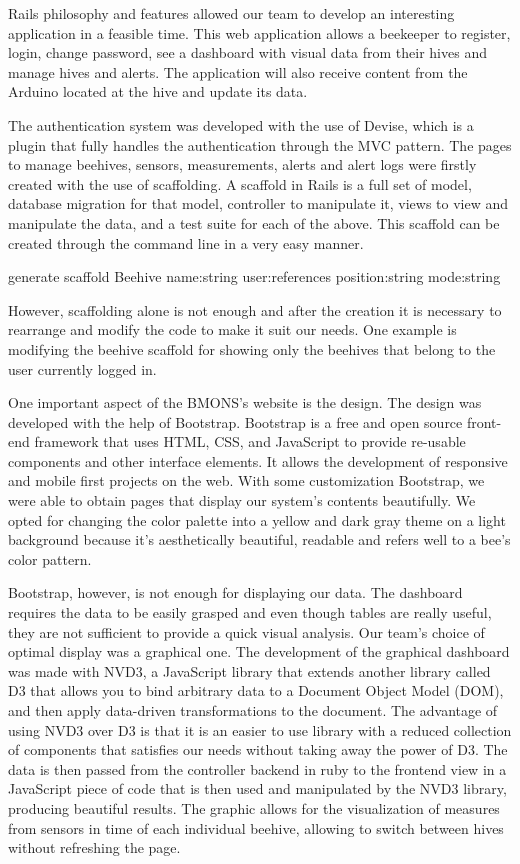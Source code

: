 Rails philosophy and features allowed our team to develop an interesting application in a feasible time. This web application allows a beekeeper to register, login, change password, see a dashboard with visual data from their hives and manage hives and alerts. The application will also receive content from the Arduino located at the hive and update its data.


The authentication system was developed with the use of Devise, which is a plugin that fully handles the authentication through the MVC pattern. The pages to manage beehives, sensors, measurements, alerts and alert logs were firstly created with the use of scaffolding. A scaffold in Rails is a full set of model, database migration for that model, controller to manipulate it, views to view and manipulate the data, and a test suite for each of the above. This scaffold can be created through the command line in a very easy manner.



\indent\indentrails generate scaffold Beehive name:string user:references position:string mode:string



However, scaffolding alone is not enough and after the creation it is necessary to rearrange and modify the code to make it suit our needs. One example is modifying the beehive scaffold for showing only the beehives that belong to the user currently logged in.


One important aspect of the BMONS's website is the design. The design was developed with the help of Bootstrap. Bootstrap is a free and open source front-end framework that uses HTML, CSS, and JavaScript to provide re-usable components and other interface elements. It allows the development of responsive and mobile first projects on the web. With some customization Bootstrap, we were able to obtain pages that display our system's contents beautifully. We opted for changing the color palette into a yellow
and dark gray theme on a light background because it's aesthetically beautiful, readable and refers well to a bee's color pattern.


Bootstrap, however, is not enough for displaying our data. The dashboard requires the data to be easily grasped and even though tables are really useful, they are not sufficient to provide a quick visual analysis. Our team's choice of optimal display was a graphical one. The development of the graphical dashboard was made with NVD3, a JavaScript library that extends another library called D3 that allows you to bind arbitrary data to a Document Object Model (DOM), and then apply data-driven transformations to the document. The advantage of using NVD3 over D3 is that it is an easier to use library with a reduced collection of components that satisfies our needs without taking away the power of D3. The data is then passed from the controller backend in ruby to the frontend view in a JavaScript piece of code that is then used and manipulated by the NVD3 library, producing beautiful results. The graphic allows for the visualization of measures from sensors in time of each individual beehive, allowing to switch between hives without refreshing the page. 


